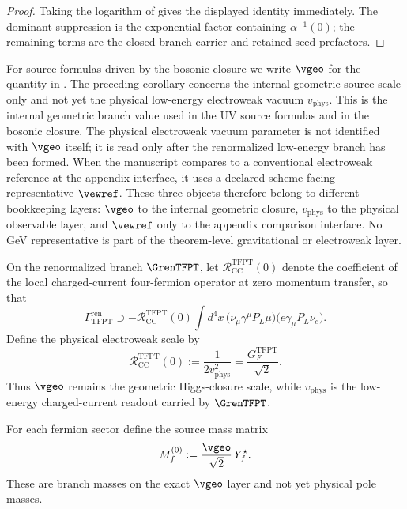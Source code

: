\begin{proof}
Taking the logarithm of  gives the displayed identity immediately. The
dominant suppression is the exponential factor containing $\alpha^{-1}(0)$; the remaining terms are
the closed-branch carrier and retained-seed prefactors.
\end{proof}

\begin{remark}
For source formulas driven by the bosonic closure we write $\vgeo$ for the quantity in
. The preceding corollary concerns the internal geometric source scale
only and not yet the physical low-energy electroweak vacuum $v_{\mathrm{phys}}$. This is the
internal geometric branch value used in the UV source formulas and in the bosonic closure. The
physical electroweak vacuum parameter is not identified with $\vgeo$ itself; it is read only after
the renormalized low-energy branch has been formed. When the manuscript compares to a conventional
electroweak reference at the appendix interface, it uses a declared scheme-facing representative
$\vewref$. These three objects therefore belong to different
bookkeeping layers: $\vgeo$ to the internal geometric closure, $v_{\mathrm{phys}}$ to the physical
observable layer, and $\vewref$ only to the appendix comparison interface. No GeV representative is
part of the theorem-level gravitational or electroweak layer.
\end{remark}

\begin{definition}
\label{def:physical-ew-scale}
On the renormalized branch $\GrenTFPT$, let $\mathcal R_{\mathrm{CC}}^{\mathrm{TFPT}}(0)$ denote the
coefficient of the local charged-current four-fermion operator at zero momentum transfer, so that
\[
\Gamma_{\mathrm{TFPT}}^{\mathrm{ren}}
\supset
-\mathcal R_{\mathrm{CC}}^{\mathrm{TFPT}}(0)
\int d^4x\,
\bigl(\bar\nu_\mu\gamma^\mu P_L\mu\bigr)\bigl(\bar e\gamma_\mu P_L\nu_e\bigr).
\]
Define the physical electroweak scale by
\[
\mathcal R_{\mathrm{CC}}^{\mathrm{TFPT}}(0)
:=
\frac{1}{2v_{\mathrm{phys}}^2}
=
\frac{G_F^{\mathrm{TFPT}}}{\sqrt2}.
\]
Thus $\vgeo$ remains the geometric Higgs-closure scale, while $v_{\mathrm{phys}}$ is the low-energy
charged-current readout carried by $\GrenTFPT$.
\end{definition}

\begin{definition}
\label{def:branch-source-masses}
For each fermion sector define the source mass matrix
\[
M_f^{(0)}:=\frac{\vgeo}{\sqrt2}\,Y_f^\star.
\]
These are branch masses on the exact $\vgeo$ layer and not yet physical pole masses.
\end{definition}

